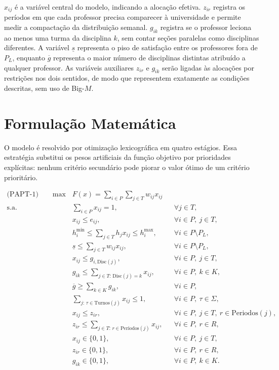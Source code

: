 \documentclass[11pt,a4paper]{article}
\begin{document}
$x_{ij}$ é a variável central do modelo, indicando a alocação efetiva. $z_{ir}$ registra os períodos em que cada professor precisa comparecer à universidade e permite medir a compactação da distribuição semanal. $g_{ik}$ registra se o professor leciona ao menos uma turma da disciplina $k$, sem contar seções paralelas como disciplinas diferentes. A variável $\underline{s}$ representa o piso de satisfação entre os professores fora de $P_L$, enquanto $\overline{g}$ representa o maior número de disciplinas distintas atribuído a qualquer professor. As variáveis auxiliares $z_{ir}$ e $g_{ik}$ serão ligadas às alocações por restrições nos dois sentidos, de modo que representem exatamente as condições descritas, sem uso de Big-$M$.

\section{Formulação Matemática}

O modelo é resolvido por otimização lexicográfica em quatro estágios. Essa estratégia substitui os pesos artificiais da função objetivo por prioridades explícitas: nenhum critério secundário pode piorar o valor ótimo de um critério prioritário.

\begin{align}
\text{(PAPT-1)} \qquad \max \quad
& F(x)=\sum_{i\in P}\sum_{j\in T}w_{ij}x_{ij} \label{eq:obj1}\\[3pt]
\text{s.a.}\quad
& \sum_{i\in P}x_{ij}=1, && \forall j\in T, \label{eq:cobertura}\\
& x_{ij}\leq e_{ij}, && \forall i\in P,\ j\in T, \label{eq:elegibilidade}\\
& h_i^{\min}\leq\sum_{j\in T}h_jx_{ij}\leq h_i^{\max},
&& \forall i\in P\setminus P_L, \label{eq:capacidade}\\
& \underline{s}\leq\sum_{j\in T}w_{ij}x_{ij},
&& \forall i\in P\setminus P_L, \label{eq:piso_satisfacao}\\
& x_{ij}\leq g_{i,\mathrm{Disc}(j)}, && \forall i\in P,\ j\in T, \label{eq:liga_disciplina}\\
& g_{ik}\leq\sum_{j\in T:\,\mathrm{Disc}(j)=k}x_{ij},
&& \forall i\in P,\ k\in K, \label{eq:liga_disciplina_reversa}\\
& \overline{g}\geq\sum_{k\in K}g_{ik}, && \forall i\in P, \label{eq:teto_disciplinas}\\
& \sum_{j:\,\tau\in\mathrm{Turnos}(j)}x_{ij}\leq1,
&& \forall i\in P,\ \tau\in\Sigma, \label{eq:conflito}\\
& x_{ij}\leq z_{ir},
&& \forall i\in P,\ j\in T,\ r\in\mathrm{Periodos}(j), \label{eq:compactacao}\\
& z_{ir}\leq\sum_{j\in T:\,r\in\mathrm{Periodos}(j)}x_{ij},
&& \forall i\in P,\ r\in R, \label{eq:compactacao_reversa}\\
& x_{ij}\in\{0,1\}, && \forall i\in P,\ j\in T, \label{eq:dom_x}\\
& z_{ir}\in\{0,1\}, && \forall i\in P,\ r\in R, \label{eq:dom_z}\\
& g_{ik}\in\{0,1\}, && \forall i\in P,\ k\in K. \label{eq:dom_g}
\end{align}
\end{document}
